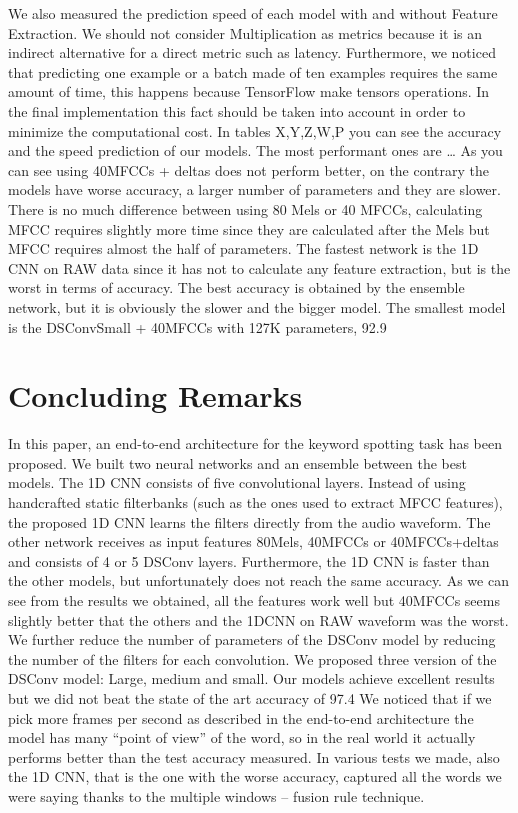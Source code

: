 \documentclass[conference]{IEEEtran}
\begin{document}
We also measured the prediction speed of each model with and without Feature Extraction. We should not consider Multiplication as metrics because it is an indirect alternative for a direct metric such as latency.
Furthermore, we noticed that predicting one example or a batch made of ten examples requires the same amount of time, this happens because TensorFlow make tensors operations. In the final implementation this fact should be taken into account in order to minimize the computational cost.
In tables X,Y,Z,W,P you can see the accuracy and the speed prediction of our models.
The most performant ones are …
As you can see using 40MFCCs + deltas does not perform better, on the contrary the models have worse accuracy, a larger number of parameters and they are slower.
There is no much difference between using 80 Mels or 40 MFCCs, calculating MFCC requires slightly more time since they are calculated after the Mels but MFCC requires almost the half of parameters.
The fastest network is the 1D CNN on RAW data since it has not to calculate any feature extraction, but is the worst in terms of accuracy.
The best accuracy is obtained by the ensemble network, but it is obviously the slower and the bigger model.
The smallest model is the DSConvSmall + 40MFCCs with 127K parameters, 92.9%


\section{Concluding Remarks}
In this paper, an end-to-end architecture for the keyword spotting task has been proposed. We built two neural networks and an ensemble between the best models.
The 1D CNN consists of five convolutional layers. Instead of using handcrafted static filterbanks (such as the ones used to extract MFCC features), the proposed 1D CNN learns the filters directly from the audio waveform. The other network receives as input features 80Mels, 40MFCCs or 40MFCCs+deltas and consists of 4 or 5 DSConv layers.
Furthermore, the 1D CNN is faster than the other models, but unfortunately does not reach the same accuracy.
As we can see from the results we obtained, all the features work well but 40MFCCs seems slightly better that the others and the 1DCNN on RAW waveform was the worst.
We further reduce the number of parameters of the DSConv model by reducing the number of the filters for each convolution. We proposed three version of the DSConv model: Large, medium and small.
Our models achieve excellent results but we did not beat the state of the art accuracy of 97.4%
We noticed that if we pick more frames per second as described in the end-to-end architecture the model has many “point of view” of the word, so in the real world it actually performs better than the test accuracy measured. In various tests we made, also the 1D CNN, that is the one with the worse accuracy, captured all the words we were saying thanks to the multiple windows – fusion rule technique.
\end{document}
